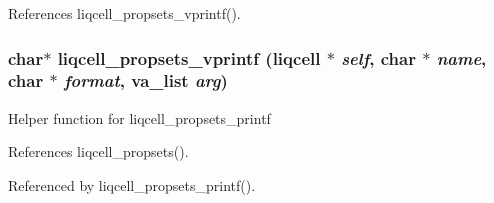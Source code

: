 References liqcell\_\-propsets\_\-vprintf().
\subsubsection[{liqcell\_\-propsets\_\-vprintf}]{\setlength{\rightskip}{0pt plus 5cm}char$\ast$ liqcell\_\-propsets\_\-vprintf (liqcell $\ast$ {\em self}, \/  char $\ast$ {\em name}, \/  char $\ast$ {\em format}, \/  va\_\-list {\em arg})}\label{d7/db4/liqcell__prop_8c_dfcb286b306ea122d2723c7826b5e4ec}


Helper function for liqcell\_\-propsets\_\-printf 

References liqcell\_\-propsets().

Referenced by liqcell\_\-propsets\_\-printf().